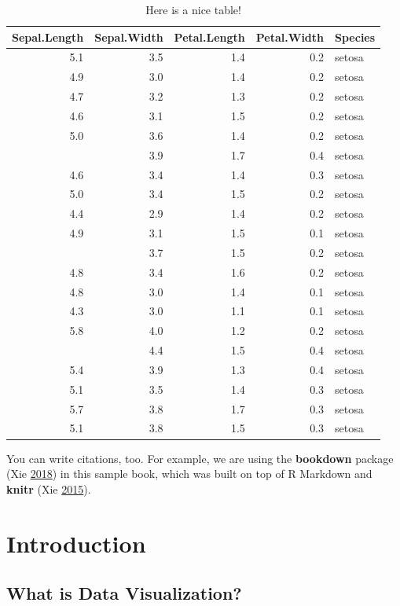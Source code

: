 \documentclass[]{book}
\theoremstyle{definition}
\theoremstyle{definition}
\theoremstyle{definition}
\theoremstyle{remark}
\begin{document}
\begin{table}

\caption{\label{tab:nice-tab}Here is a nice table!}
\centering
\begin{tabular}[t]{rrrrl}
\toprule
Sepal.Length & Sepal.Width & Petal.Length & Petal.Width & Species\\
\midrule
5.1 & 3.5 & 1.4 & 0.2 & setosa\\
4.9 & 3.0 & 1.4 & 0.2 & setosa\\
4.7 & 3.2 & 1.3 & 0.2 & setosa\\
4.6 & 3.1 & 1.5 & 0.2 & setosa\\
5.0 & 3.6 & 1.4 & 0.2 & setosa\\
\addlinespace
5.4 & 3.9 & 1.7 & 0.4 & setosa\\
4.6 & 3.4 & 1.4 & 0.3 & setosa\\
5.0 & 3.4 & 1.5 & 0.2 & setosa\\
4.4 & 2.9 & 1.4 & 0.2 & setosa\\
4.9 & 3.1 & 1.5 & 0.1 & setosa\\
\addlinespace
5.4 & 3.7 & 1.5 & 0.2 & setosa\\
4.8 & 3.4 & 1.6 & 0.2 & setosa\\
4.8 & 3.0 & 1.4 & 0.1 & setosa\\
4.3 & 3.0 & 1.1 & 0.1 & setosa\\
5.8 & 4.0 & 1.2 & 0.2 & setosa\\
\addlinespace
5.7 & 4.4 & 1.5 & 0.4 & setosa\\
5.4 & 3.9 & 1.3 & 0.4 & setosa\\
5.1 & 3.5 & 1.4 & 0.3 & setosa\\
5.7 & 3.8 & 1.7 & 0.3 & setosa\\
5.1 & 3.8 & 1.5 & 0.3 & setosa\\
\bottomrule
\end{tabular}
\end{table}

You can write citations, too. For example, we are using the
\textbf{bookdown} package (Xie \protect\hyperlink{ref-R-bookdown}{2018})
in this sample book, which was built on top of R Markdown and
\textbf{knitr} (Xie \protect\hyperlink{ref-xie2015}{2015}).

\chapter{Introduction}\label{introduction}

\section{What is Data Visualization?}\label{what-is-data-visualization}
\end{document}
